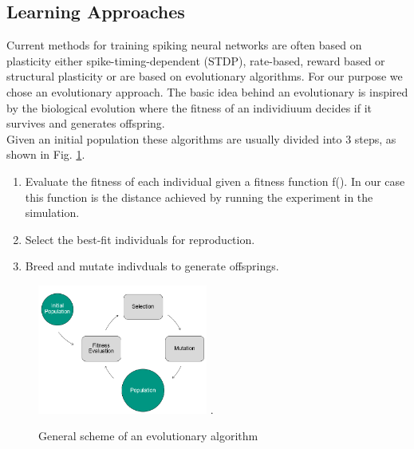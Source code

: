 \subsection{Learning Approaches}
Current methods for training spiking neural networks are often based on plasticity either spike-timing-dependent (STDP), rate-based, reward based or structural plasticity or are based on evolutionary algorithms. %
For our purpose we chose an evolutionary approach. The basic idea behind an evolutionary is inspired by the biological evolution where the fitness of an individiuum decides if it survives and generates offspring. \\ Given an initial population these algorithms are usually divided into 3 steps, as shown in Fig. \ref{evo_base}. 
 \begin{enumerate}
 	\item Evaluate the fitness of each individual given a fitness function f(). In our case this function is the distance achieved by running the experiment in the simulation.
 	\item Select the best-fit individuals for reproduction.
 	\item Breed and mutate indivduals to generate offsprings.
 \end{enumerate}


\begin{figure}[H]
	\centering
	\includegraphics[width=2.2in]{img/evo_base.png}
	\DeclareGraphicsExtensions.
	\caption{General scheme of an evolutionary algorithm}
	\label{evo_base}
\end{figure}

